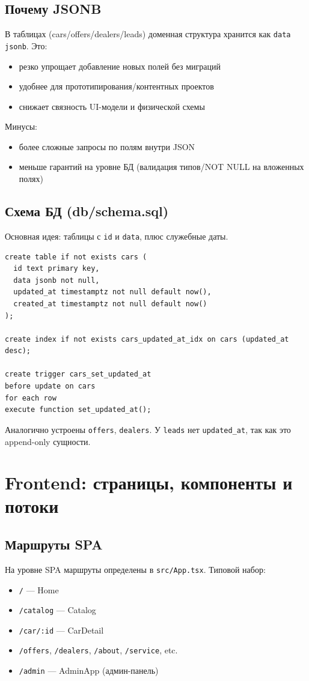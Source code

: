 \documentclass[12pt,a4paper]{article}
\begin{document}
\subsection{Почему JSONB}
В таблицах (cars/offers/dealers/leads) доменная структура хранится как \texttt{data jsonb}. Это:
\begin{itemize}[leftmargin=18pt]
  \item резко упрощает добавление новых полей без миграций
  \item удобнее для прототипирования/контентных проектов
  \item снижает связность UI-модели и физической схемы
\end{itemize}
Минусы:
\begin{itemize}[leftmargin=18pt]
  \item более сложные запросы по полям внутри JSON
  \item меньше гарантий на уровне БД (валидация типов/NOT NULL на вложенных полях)
\end{itemize}

\subsection{Схема БД (db/schema.sql)}
Основная идея: таблицы с \texttt{id} и \texttt{data}, плюс служебные даты.

\begin{verbatim}
create table if not exists cars (
  id text primary key,
  data jsonb not null,
  updated_at timestamptz not null default now(),
  created_at timestamptz not null default now()
);

create index if not exists cars_updated_at_idx on cars (updated_at desc);

create trigger cars_set_updated_at
before update on cars
for each row
execute function set_updated_at();
\end{verbatim}

Аналогично устроены \texttt{offers}, \texttt{dealers}. У \texttt{leads} нет \texttt{updated_at}, так как это append-only сущности.

\section{Frontend: страницы, компоненты и потоки}
\subsection{Маршруты SPA}
На уровне SPA маршруты определены в \texttt{src/App.tsx}. Типовой набор:
\begin{itemize}[leftmargin=18pt]
  \item \texttt{/} --- Home
  \item \texttt{/catalog} --- Catalog
  \item \texttt{/car/:id} --- CarDetail
  \item \texttt{/offers}, \texttt{/dealers}, \texttt{/about}, \texttt{/service}, etc.
  \item \texttt{/admin} --- AdminApp (админ-панель)
\end{itemize}
\end{document}
